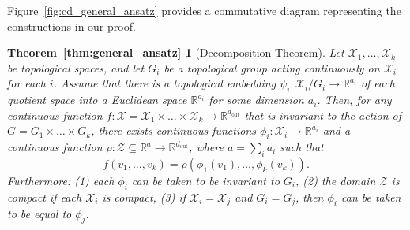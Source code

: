 \documentclass{article} \usepackage{iclr2023_conference,times}
\newcommand{\RR}{\mathbb R}
\newcommand{\mc}[1]{\mathcal{#1}}
\newcommand{\mrm}[1]{\mathrm{#1}}
\newcommand{\dout}{d_{\mrm{out}}}
\begin{document}
Figure~\ref{fig:cd_general_ansatz} provides a commutative diagram representing the constructions in our proof.
\newtheorem*{thm:general_ansatz}{Theorem~\ref{thm:general_ansatz}}
\begin{thm:general_ansatz}[Decomposition Theorem]
    Let $\mc X_1, \ldots, \mc X_k$ be  topological spaces, and let $G_i$ be a topological group acting continuously on $\mc X_i$ for each $i$. Assume that there is a topological embedding $\psi_i : \mc X_i / G_i \to \RR^{a_i}$ of each quotient space into a Euclidean space $\RR^{a_i}$ for some dimension $a_i$. 
    Then, for any continuous function $f: \mc X = \mc X_1 \times \ldots \times \mc X_k \to \RR^{\dout}$  that is invariant to the action of $G = G_1 \times \ldots \times G_k$, there exists continuous functions $\phi_i : \mc X_i \to \RR^{a_i}$ and a continuous function $\rho: \mc Z \subseteq \RR^{a} \to \RR^{\dout}$, where $a = \sum_i a_i$ such that
    \begin{equation}
        f(v_1, \ldots, v_k) = \rho( \phi_1(v_1), \ldots,  \phi_k(v_k) ).
    \end{equation}
    Furthermore: (1) each $\phi_i$ can be taken to be invariant to $G_i$, (2) the domain $\mc Z$ is compact if each $\mc X_i$ is compact, (3) if $\mc X_i = \mc X_j$ and $G_i = G_j$, then $\phi_i$ can be taken to be equal to $\phi_j$. 
\end{thm:general_ansatz}
\end{document}
